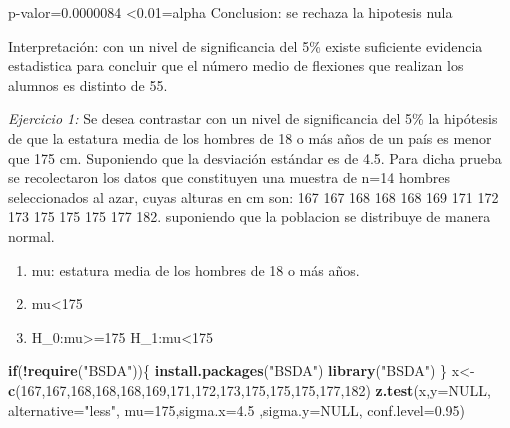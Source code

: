 \documentclass[
]{article}
\newenvironment{Shaded}{\begin{snugshade}}{\end{snugshade}}
\newcommand{\AttributeTok}[1]{\textcolor[rgb]{0.13,0.29,0.53}{#1}}
\newcommand{\ConstantTok}[1]{\textcolor[rgb]{0.56,0.35,0.01}{#1}}
\newcommand{\ControlFlowTok}[1]{\textcolor[rgb]{0.13,0.29,0.53}{\textbf{#1}}}
\newcommand{\DecValTok}[1]{\textcolor[rgb]{0.00,0.00,0.81}{#1}}
\newcommand{\FloatTok}[1]{\textcolor[rgb]{0.00,0.00,0.81}{#1}}
\newcommand{\FunctionTok}[1]{\textcolor[rgb]{0.13,0.29,0.53}{\textbf{#1}}}
\newcommand{\NormalTok}[1]{#1}
\newcommand{\OtherTok}[1]{\textcolor[rgb]{0.56,0.35,0.01}{#1}}
\newcommand{\SpecialCharTok}[1]{\textcolor[rgb]{0.81,0.36,0.00}{\textbf{#1}}}
\newcommand{\StringTok}[1]{\textcolor[rgb]{0.31,0.60,0.02}{#1}}
\begin{document}
p-valor=0.0000084 \textless0.01=alpha Conclusion: se rechaza la
hipotesis nula

Interpretación: con un nivel de significancia del 5\% existe suficiente
evidencia estadistica para concluir que el número medio de flexiones que
realizan los alumnos es distinto de 55.

\emph{Ejercicio 1:} Se desea contrastar con un nivel de significancia
del 5\% la hipótesis de que la estatura media de los hombres de 18 o más
años de un país es menor que 175 cm. Suponiendo que la desviación
estándar es de 4.5. Para dicha prueba se recolectaron los datos que
constituyen una muestra de n=14 hombres seleccionados al azar, cuyas
alturas en cm son: 167 167 168 168 168 169 171 172 173 175 175 175 177
182. suponiendo que la poblacion se distribuye de manera normal.

\begin{enumerate}
\def\labelenumi{\arabic{enumi}.}
\item
  mu: estatura media de los hombres de 18 o más años.
\item
  mu\textless175
\item
  H\_0:mu\textgreater=175 H\_1:mu\textless175
\end{enumerate}

\begin{Shaded}
\begin{Highlighting}[]
\ControlFlowTok{if}\NormalTok{(}\SpecialCharTok{!}\FunctionTok{require}\NormalTok{(}\StringTok{"BSDA"}\NormalTok{))\{}
\FunctionTok{install.packages}\NormalTok{(}\StringTok{"BSDA"}\NormalTok{)}
\FunctionTok{library}\NormalTok{(}\StringTok{"BSDA"}\NormalTok{)}
\NormalTok{\}}
\NormalTok{x}\OtherTok{\textless{}{-}}\FunctionTok{c}\NormalTok{(}\DecValTok{167}\NormalTok{,}\DecValTok{167}\NormalTok{,}\DecValTok{168}\NormalTok{,}\DecValTok{168}\NormalTok{,}\DecValTok{168}\NormalTok{,}\DecValTok{169}\NormalTok{,}\DecValTok{171}\NormalTok{,}\DecValTok{172}\NormalTok{,}\DecValTok{173}\NormalTok{,}\DecValTok{175}\NormalTok{,}\DecValTok{175}\NormalTok{,}\DecValTok{175}\NormalTok{,}\DecValTok{177}\NormalTok{,}\DecValTok{182}\NormalTok{)}
\FunctionTok{z.test}\NormalTok{(x,}\AttributeTok{y=}\ConstantTok{NULL}\NormalTok{, }\AttributeTok{alternative=}\StringTok{"less"}\NormalTok{, }\AttributeTok{mu=}\DecValTok{175}\NormalTok{,}\AttributeTok{sigma.x=}\FloatTok{4.5}\NormalTok{ ,}\AttributeTok{sigma.y=}\ConstantTok{NULL}\NormalTok{, }\AttributeTok{conf.level=}\FloatTok{0.95}\NormalTok{)}
\end{Highlighting}
\end{Shaded}
\end{document}
